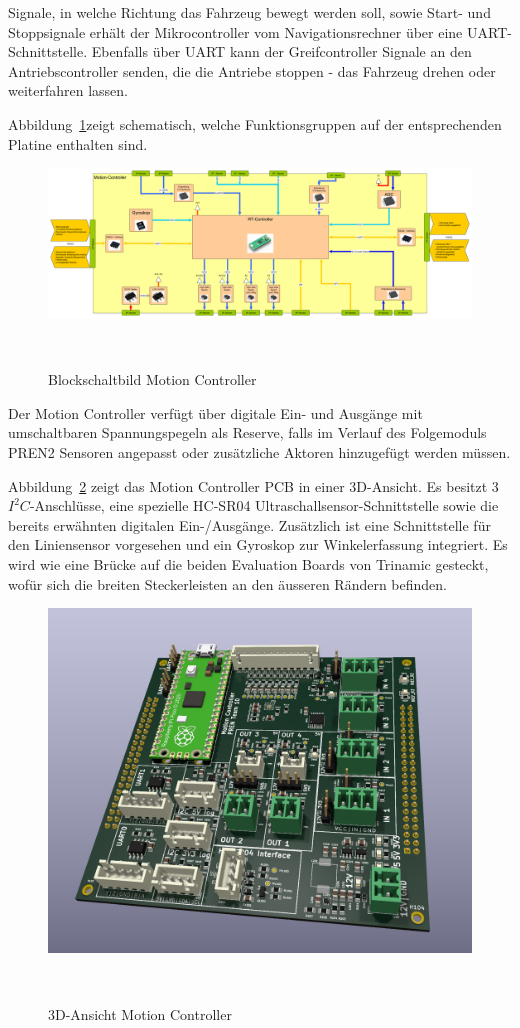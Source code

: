 \documentclass[main.tex]{subfiles} %
\begin{document}
Signale, in welche Richtung das Fahrzeug bewegt werden soll, sowie Start- und
Stoppsignale erhält der Mikrocontroller vom Navigationsrechner über eine
UART-Schnittstelle. Ebenfalls über UART kann der Greifcontroller Signale an den
Antriebscontroller senden, die die Antriebe stoppen - das Fahrzeug drehen oder
weiterfahren lassen.

Abbildung~\ref{fig:Blockschaltbild_Motioncontroller}zeigt schematisch, welche
Funktionsgruppen auf der entsprechenden Platine enthalten sind.

\begin{figure}[H]
    \centering
    \includegraphics[width = 1\linewidth]{fig_Antriebe_und_Dimensionierung/MotionController_Blockschaltbild.pdf}
    \caption{Blockschaltbild Motion Controller}~\label{fig:Blockschaltbild_Motioncontroller}
\end{figure}

Der Motion Controller verfügt über digitale Ein- und Ausgänge mit umschaltbaren
Spannungspegeln als Reserve, falls im Verlauf des Folgemoduls PREN2 Sensoren
angepasst oder zusätzliche Aktoren hinzugefügt werden müssen.

Abbildung~\ref{fig:MotionBoard_PCB} zeigt das Motion Controller PCB in einer
3D-Ansicht. Es besitzt 3 $I^2C$-Anschlüsse, eine spezielle HC-SR04
Ultraschallsensor-Schnittstelle sowie die bereits erwähnten digitalen
Ein-/Ausgänge. Zusätzlich ist eine Schnittstelle für den Liniensensor
vorgesehen und ein Gyroskop zur Winkelerfassung integriert. Es wird wie eine
Brücke auf die beiden Evaluation Boards von Trinamic gesteckt, wofür sich die
breiten Steckerleisten an den äusseren Rändern befinden.

\begin{figure}[H]
    \centering
    \includegraphics[width = 0.75\linewidth]{fig_Antriebe_und_Dimensionierung/MotionControllerPCB.jpg}
    \caption{3D-Ansicht Motion Controller}~\label{fig:MotionBoard_PCB}
\end{figure}
\end{document}
